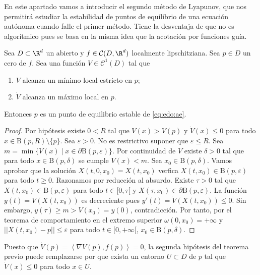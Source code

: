 En este apartado vamos a introducir el segundo método de Lyapunov, que nos permitirá estudiar la
estabilidad de puntos de equilibrio de una ecuación autónoma cuando falle el primer método. Tiene la
desventaja de que no es algorítmico pues se basa en la misma idea que la acotación por funciones
guía.

\begin{theorem} \label{thm:lyapunov:2} Sea $D \subset \R^d$ un abierto y
  $f \in \mathcal{C}(D, \R^d)$ localmente lipschitziana. Sea $p \in D$ un cero de $f$. Sea una
  función $V \in \mathcal{C}^1(D)$ tal que
  \begin{enumerate}
  \item $V$ alcanza un mínimo local estricto en $p$;
  \item $\dot{V}$ alcanza un máximo local en $p$.
  \end{enumerate}
  Entonces $p$ es un punto de equilibrio estable de \eqref{eq:edo:ae}.
\end{theorem}
\begin{proof}
  Por hipótesis existe $0 < R$ tal que $V(x) > V(p)$ y $\dot{V}(x) \le 0$ para todo
  $x \in \overline{\mathrm{B}}(p, R) \setminus \{p\}$. Sea $\varepsilon > 0$. No es restrictivo
  suponer que $\varepsilon \le R$. Sea
  $m = \min \{V(x) \mid x \in \partial \mathrm{B}(p,\varepsilon)\}$. Por continuidad de $V$ existe
  $\delta > 0$ tal que para todo $x \in \mathrm{B}(p, \delta)$ se cumple $V(x) < m$. Sea
  $x_0 \in \mathrm{B}(p, \delta)$. Vamos aprobar que la solución $X(t,0,x_0) = X(t,x_0)$ verfica
  $X(t, x_0) \in \mathrm{B}(p,\varepsilon)$ para todo $t \ge 0$. Razonamos por reducción al
  absurdo. Existe $\tau > 0$ tal que $X(t, x_0) \in \mathrm{B}(p,\varepsilon)$ para todo
  $t \in [0, \tau[$ y $X(\tau, x_0) \in \partial \mathrm{B}(p,\varepsilon)$. La función
  $y(t) = V(X(t,x_0))$ es decreciente pues $y'(t) = \dot{V}(X(t,x_0)) \le 0$. Sin embargo,
  $y(\tau) \ge m > V(x_0) = y(0)$, contradicción. Por tanto, por el teorema de comportamiento en el
  extremo superior $\omega(0, x_0) = +\infty$ y $||X(t, x_0) - p|| \le \varepsilon$ para todo
  $t \in [0,+\infty[$, $x_0 \in \mathrm{B}(p,\delta)$.
\end{proof}

\begin{remark}
  Puesto que $\dot{V}(p) = \left\langle \nabla V(p), f(p) \right\rangle = 0$, la segunda hipótesis
  del teorema previo puede remplazarse por que exista un entorno $U \subset D$ de $p$ tal que
  $\dot{V}(x) \le 0$ para todo $x \in U$.
\end{remark}

